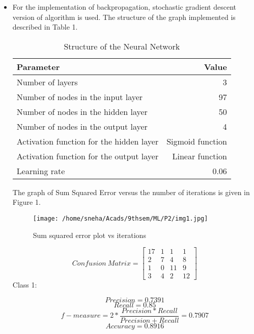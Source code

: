 \documentclass[12pt]{article}
\begin{document}
\begin{itemize}
\item{
For the implementation of backpropagation, stochastic gradient descent version of algorithm is used. The structure of the graph implemented is described in Table 1.

\begin{table}
\centering
		\begin{tabular}{|l | r|}
			\hline
			\textbf{Parameter} & \textbf{Value} \\ \hline
			 Number of layers & 3 \\ \hline
			Number of nodes in the input layer & 97 \\ \hline
			Number of nodes in the hidden layer & 50  \\ \hline
			Number of nodes in the output layer  & 4\\ \hline
			Activation function for the hidden layer  & Sigmoid function\\ \hline
			Activation function for the output layer  & Linear function\\ \hline
			Learning rate & 0.06 \\ \hline
			
			
			
		\end{tabular}
	\caption{Structure of the Neural Network}

\end{table}

The graph of Sum Squared Error versus the number of iterations is given in Figure 1.
\begin{figure}
	\centering
		\texttt{[image: /home/sneha/Acads/9thsem/ML/P2/img1.jpg]}
	\caption{Sum squared error plot vs iterations}
	
\end{figure}

\begin{equation}
Confusion\ Matrix = \begin{bmatrix} 17  & 1 & 1 & 1\\ 2 & 7 & 4 & 8 \\ 1 & 0 & 11 & 9 \\ 3 & 4 & 2 & 12 \end{bmatrix}
\end{equation}
Class 1:

\begin{equation}
Precision = 0.7391
\end{equation}
\begin{equation}
Recall = 0.85
\end{equation}
\begin{equation}
f-measure = 2*\frac{Precision*Recall}{Precision + Recall} = 0.7907
\end{equation}
\begin{equation}
Accuracy = 0.8916
\end{equation}

}
\end{itemize}
\end{document}

